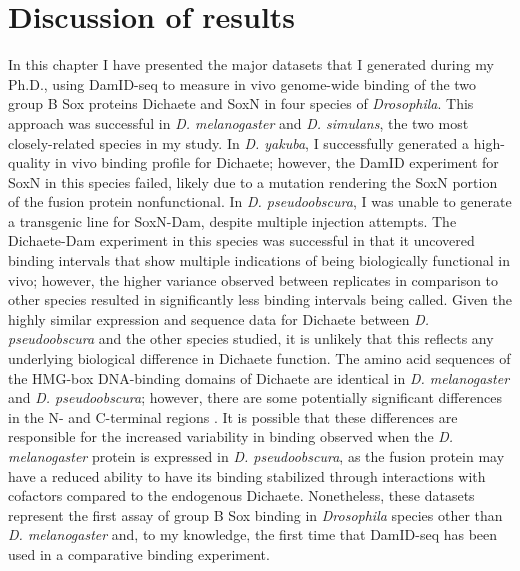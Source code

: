 \section{Discussion of results}
In this chapter I have presented the major datasets that I generated during my Ph.D., using DamID-seq to measure in vivo genome-wide binding of the two group B Sox proteins Dichaete and SoxN in four species of \emph{Drosophila}. This approach was successful in \emph{D. melanogaster} and \emph{D. simulans}, the two most closely-related species in my study. In \emph{D. yakuba}, I successfully generated a high-quality in vivo binding profile for Dichaete; however, the DamID experiment for SoxN in this species failed, likely due to a mutation rendering the SoxN portion of the fusion protein nonfunctional. In \emph{D. pseudoobscura}, I was unable to generate a transgenic line for SoxN-Dam, despite multiple injection attempts. The Dichaete-Dam experiment in this species was successful in that it uncovered binding intervals that show multiple indications of being biologically functional in vivo; however, the higher variance observed between replicates in comparison to other species resulted in significantly less binding intervals being called. Given the highly similar expression and sequence data for Dichaete between \emph{D. pseudoobscura} and the other species studied, it is unlikely that this reflects any underlying biological difference in Dichaete function. The amino acid sequences of the HMG-box DNA-binding domains of Dichaete are identical in \emph{D. melanogaster} and \emph{D. pseudoobscura}; however, there are some potentially significant differences in the N- and C-terminal regions \citep{mckimmie_conserved_2005}. It is possible that these differences are responsible for the increased variability in binding observed when the \emph{D. melanogaster} protein is expressed in \emph{D. pseudoobscura}, as the fusion protein may have a reduced ability to have its binding stabilized through interactions with cofactors compared to the endogenous Dichaete. Nonetheless, these datasets represent the first assay of group B Sox binding in \emph{Drosophila} species other than \emph{D. melanogaster} and, to my knowledge, the first time that DamID-seq has been used in a comparative binding experiment.\\ 

